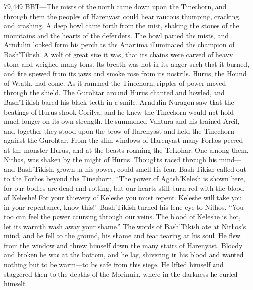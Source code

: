 \documentclass[smalldemyvopaper,11pt,twoside,onecolumn,openright,extrafontsizes]{memoir}
\begin{document}
79,449 BBT—The mists of the north came down upon the Tinechorn, and through them the peoples of Harenyast could hear raucous thumping, cracking, and crashing. A deep howl came forth from the mist, shaking the stones of the mountains and the hearts of the defenders. The howl parted the mists, and Arndulin looked form his perch as the Anariima illuminated the champion of Bash’Tikish. A wolf of great size it was, that its chains were carved of heavy stone and weighed many tons. Its breath was hot in its anger such that it burned, and fire spewed from its jaws and smoke rose from its nostrils. Hurus, the Hound of Wrath, had come. As it rammed the Tinechorn, ripples of power moved through the shield. The Gurohtar around Hurus chanted and howled, and Bash’Tikish bared his black teeth in a smile. Arndulin Nuragon saw that the beatings of Hurus shook Corilya, and he knew the Tinechorn would not hold much longer on its own strength. He summoned Vantura and his trained Areil, and together they stood upon the brow of Harenyast and held the Tinechorn against the Gurohtar.
	From the slim windows of Harenyast many Forhos peered at the monster Hurus, and at the beasts roaming the Telkohar. One among them, Nithos, was shaken by the might of Hurus. Thoughts raced through his mind—and Bash’Tikish, grown in his power, could smell his fear. Bash’Tikish called out to the Forhos beyond the Tinechorn, “The power of Agash’Kelesh is shown here, for our bodies are dead and rotting, but our hearts still burn red with the blood of Keleshe! For your thievery of Keleshe you must repent. Keleshe will take you in your repentance, know this!” Bash’Tikish turned his lone eye to Nithos. “You too can feel the power coursing through our veins. The blood of Keleshe is hot, let its warmth wash away your shame.” The words of Bash’Tikish ate at Nithos’s mind, and he fell to the ground, his shame and fear tearing at his soul. He flew from the window and threw himself down the many stairs of Harenyast. Bloody and broken he was at the bottom, and he lay, shivering in his blood and wanted nothing but to be warm—to be safe from this siege. He lifted himself and staggered then to the depths of the Morinuin, where in the darkness he curled himself.
\end{document}

